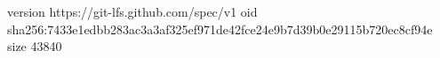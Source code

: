 version https://git-lfs.github.com/spec/v1
oid sha256:7433e1edbb283ac3a3af325ef971de42fce24e9b7d39b0e29115b720ec8cf94e
size 43840
